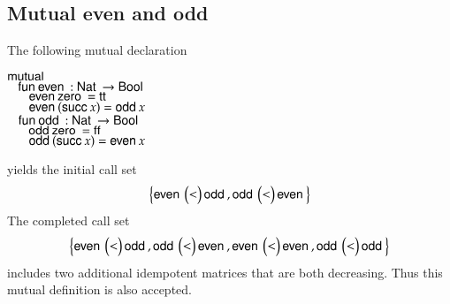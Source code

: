 \subsection{Mutual even and odd}

The following mutual declaration 
\begin{bsp}
$\mathsf{mutual}\:$\\
$\hspace*{3mm} \mathsf{fun}\: \mathsf{even}\: : \mathsf{Nat}\: \rightarrow \mathsf{Bool}$\\
$\spc \spc \even \zero = \ttt $\\
$\spc \spc \even (\suc x) = \odd x $\\
$\hspace*{3mm} \mathsf{fun}\: \mathsf{odd}\: : \mathsf{Nat}\: \rightarrow \mathsf{Bool}$\\
$\spc \spc \odd \zero = \fff$\\
$\spc \spc \odd (\suc x) = \even x$
\end{bsp}
yields the initial call set  
\[
\left\{
\mathsf{even}\: \begin{pmatrix}
< \\
\end{pmatrix}\mathsf{odd}\:
, 
\mathsf{odd}\: \begin{pmatrix}
< \\
\end{pmatrix}\mathsf{even}\:
\right\}
\] 
\noindent The completed call set
\[
\left\{
\mathsf{even}\: \begin{pmatrix}
< \\
\end{pmatrix}\mathsf{odd}\:
, 
\mathsf{odd}\: \begin{pmatrix}
< \\
\end{pmatrix}\mathsf{even}\:
,
\mathsf{even}\: \begin{pmatrix}
< \\
\end{pmatrix}\mathsf{even}\:
, 
\mathsf{odd}\: \begin{pmatrix}
< \\
\end{pmatrix}\mathsf{odd}\:
\right\}
\] 
includes two additional idempotent matrices that are both decreasing.
Thus this mutual definition is also accepted.

